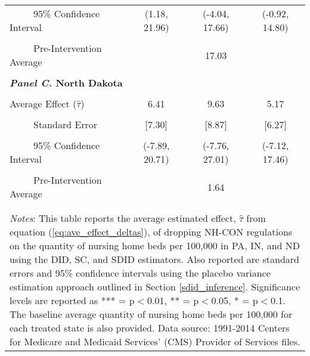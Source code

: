 \documentclass[../Main.tex]{subfiles}
\begin{document}
\begin{table}[htbp]
\begin{tabular}{l*{3}{c}}
\\[-2ex]
\multicolumn{1}{l}{\ \ \ \ \ 95\% Confidence Interval}&   \multicolumn{1}{c}{(1.18, 21.96)}&   \multicolumn{1}{c}{(-4.04, 17.66)}&   \multicolumn{1}{c}{(-0.92, 14.80)}\\
\\[-2ex]
\multicolumn{1}{l}{\ \ \ \ \ Pre-Intervention Average}&   \multicolumn{3}{c}{17.03}\\
\\[-.1ex]
\multicolumn{4}{l}{\textbf{\textit{Panel C.} North Dakota}}\\
\\[-1.5ex]
\multicolumn{1}{l}{Average Effect ($\hat{\tau}$)}&   \multicolumn{1}{c}{6.41}&   \multicolumn{1}{c}{9.63}&  \multicolumn{1}{c}{5.17}\\
\\[-2ex]
\multicolumn{1}{l}{\ \ \ \ \ Standard Error}  &\multicolumn{1}{c}{[7.30]}&\multicolumn{1}{c}{[8.87]}&\multicolumn{1}{c}{[6.27]}\\
\\[-2ex]
\multicolumn{1}{l}{\ \ \ \ \ 95\% Confidence Interval}&   \multicolumn{1}{c}{(-7.89, 20.71)}&   \multicolumn{1}{c}{(-7.76, 27.01)}&   \multicolumn{1}{c}{(-7.12, 17.46)}\\
\\[-2ex]
\multicolumn{1}{l}{\ \ \ \ \ Pre-Intervention Average}&   \multicolumn{3}{c}{1.64}\\
\\[-.1ex]
\hline\hline
\\[-2ex]
\multicolumn{4}{p{.75\linewidth}}{\footnotesize \textit{Notes}: This table reports the average estimated effect, $\hat{\tau}$ from equation (\ref{eq:ave_effect_deltas}), of dropping NH-CON regulations on the quantity of nursing home beds per 100,000 in PA, IN, and ND using the DID, SC, and SDID estimators. Also reported are standard errors and 95\% confidence intervals using the placebo variance estimation approach outlined in Section \ref{sdid_inference}. Significance levels are reported as *** = p$<$0.01, ** = p$<$0.05, * = p$<$0.1. The baseline average quantity of nursing home beds per 100,000 for each treated state is also provided. Data source: 1991-2014 Centers for Medicare and Medicaid Services’ (CMS) Provider of Services files.}
\end{tabular}
\end{table}
\vfill
\clearpage
\end{document}
